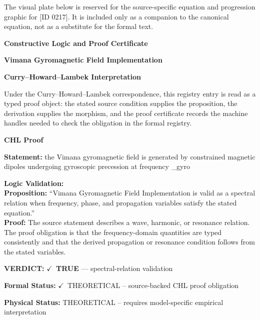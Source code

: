\begingroup\footnotesize\sloppy
The visual plate below is reserved for the source-specific equation and progression graphic for [ID 0217]. It is included only as a companion to the canonical equation, not as a substitute for the formal text.
\par\endgroup
\ifTZPDarkEdition
{}
\fi

\clearpage
\begingroup\tzpsupportsetup
\noindent\textbf{\fontsize{10.8pt}{12.8pt}\selectfont [ID 0217] Constructive Logic and Proof Certificate}\par
\noindent\textbf{\fontsize{10pt}{12pt}\selectfont Vimana Gyromagnetic Field Implementation}\par
\vspace{0.45em}
\begingroup
\footnotesize
\setlength{\parskip}{0.22em}
\setlength{\parindent}{0pt}
\noindent\textbf{Curry--Howard--Lambek Interpretation}\par
Under the Curry--Howard--Lambek correspondence, this registry entry is read as a typed proof
object: the stated source condition supplies the proposition, the derivation supplies the
morphism, and the proof certificate records the machine handles needed to check the obligation
in the formal registry.

\vspace{0.45em}
\noindent\textbf{CHL Proof}\par
\textbf{Statement:} the Vimana gyromagnetic field is generated by constrained magnetic dipoles undergoing
gyroscopic precession at frequency \_gyro

\textbf{Logic Validation:}\\
\textbf{Proposition:} ``Vimana Gyromagnetic Field Implementation is valid as a spectral relation when frequency,
phase, and propagation variables satisfy the stated equation.''\\
\textbf{Proof:} The source statement describes a wave, harmonic, or resonance relation. The proof
obligation is that the frequency-domain quantities are typed consistently and that the
derived propagation or resonance condition follows from the stated variables.

\textbf{VERDICT:} \ensuremath{\checkmark}\ \textbf{TRUE} --- spectral-relation validation

\textbf{Formal Status:} \ensuremath{\checkmark}\ THEORETICAL -- source-backed CHL proof obligation

\textbf{Physical Status:} THEORETICAL -- requires model-specific empirical interpretation
\par\vspace{0.45em}
\par
\ifTZPDarkEdition
{}
\fi
\endgroup
\endgroup
